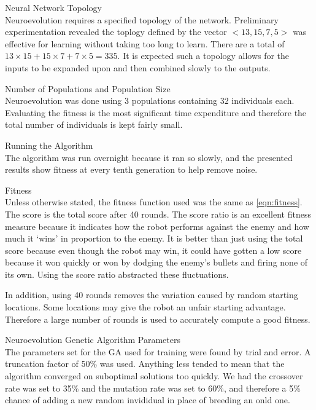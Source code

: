 \begin{description}
\item Neural Network Topology \hfill \\
Neuroevolution requires a specified topology of the network. Preliminary experimentation revealed the toplogy defined by the vector $<13, 15, 7, 5>$ was effective for learning without taking too long to learn. There are a total of $13 \times 15 + 15 \times 7 + 7 \times 5 = 335$. It is expected such a topology allows for the inputs to be expanded upon and then combined slowly to the outputs.

\item Number of Populations and Population Size \hfill \\
Neuroevolution was done using 3 populations containing 32 individuals each. Evaluating the fitness is the most significant time expenditure and therefore the total number of individuals is kept fairly small. 

\item Running the Algorithm \hfill \\
The algorithm was run overnight because it ran so slowly, and the presented results show fitness at every tenth generation to help remove noise.

\item Fitness \hfill \\
Unless otherwise stated, the fitness function used was the same as \ref{eqn:fitness}. The score is the total score after 40 rounds. The score ratio is an excellent fitness measure because it indicates how the robot performs against the enemy and how much it `wins' in proportion to the enemy. It is better than just using the total score because even though the robot may win, it could have gotten a low score because it won quickly or won by dodging the enemy's bullets and firing none of its own. Using the score ratio abstracted these fluctuations. 

In addition, using 40 rounds removes the variation caused by random starting locations. Some locations may give the robot an unfair starting advantage. Therefore a large number of rounds is used to accurately compute a good fitness.

\item Neuroevolution Genetic Algorithm Parameters \hfill \\
The parameters set for the GA used for training were found by trial and error. A truncation factor of 50\% was used. Anything less tended to mean that the algorithm converged on suboptimal solutions too quickly. We had the crossover rate was set to 35\% and the mutation rate was set to 60\%, and therefore a 5\% chance of adding a new random invididual in place of breeding an onld one.


\end{description}
